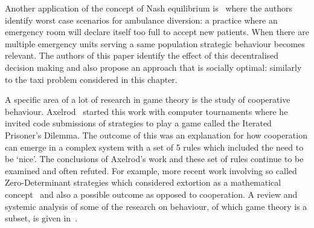 Another application of the concept of Nash equilibrium
is~\cite{deo2011centralized} where the authors identify worst case
scenarios for ambulance diversion: a practice where an emergency room will
declare itself too full to accept new patients. When there are multiple emergency
units serving a same population strategic behaviour becomes relevant. The
authors of this paper identify the effect of this decentralised decision making
and also propose an approach that is socially optimal: similarly to the taxi
problem considered in this chapter.

A specific area of a lot of research in game theory is the study of cooperative 
behaviour. Axelrod~\cite{axelrod1990evolution} started this work
with computer tournaments where he invited code submissions of strategies to
play a game called the Iterated Prisoner's
Dilemma. The outcome of this was an
explanation for how cooperation can emerge in a complex system with a set of 5
rules which included the need to be `nice'. The conclusions of Axelrod's work
and these set of rules continue to be examined and often refuted. For example,
more recent work involving so called Zero-Determinant
strategies which considered extortion as a mathematical
concept~\cite{press2012iterated} and also a possible outcome as opposed to
cooperation.
A review and systemic analysis of some of the research on behaviour, of which
game theory is a subset,
is given in~\cite{press2012iterated}.
